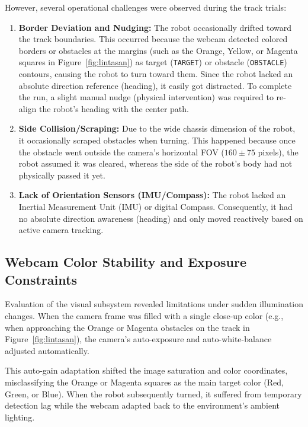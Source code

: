 However, several operational challenges were observed during the track trials:
\begin{enumerate}
    \item \textbf{Border Deviation and Nudging:} The robot occasionally drifted toward the track boundaries. This occurred because the webcam detected colored borders or obstacles at the margins (such as the Orange, Yellow, or Magenta squares in Figure~\ref{fig:lintasan}) as target (\texttt{TARGET}) or obstacle (\texttt{OBSTACLE}) contours, causing the robot to turn toward them. Since the robot lacked an absolute direction reference (heading), it easily got distracted. To complete the run, a slight manual nudge (physical intervention) was required to re-align the robot's heading with the center path.
    \item \textbf{Side Collision/Scraping:} Due to the wide chassis dimension of the robot, it occasionally scraped obstacles when turning. This happened because once the obstacle went outside the camera's horizontal FOV ($160 \pm 75$ pixels), the robot assumed it was cleared, whereas the side of the robot's body had not physically passed it yet.
    \item \textbf{Lack of Orientation Sensors (IMU/Compass):} The robot lacked an Inertial Measurement Unit (IMU) or digital Compass. Consequently, it had no absolute direction awareness (heading) and only moved reactively based on active camera tracking.
\end{enumerate}

\subsection{Webcam Color Stability and Exposure Constraints}
Evaluation of the visual subsystem revealed limitations under sudden illumination changes. When the camera frame was filled with a single close-up color (e.g., when approaching the Orange or Magenta obstacles on the track in Figure~\ref{fig:lintasan}), the camera's auto-exposure and auto-white-balance adjusted automatically.

This auto-gain adaptation shifted the image saturation and color coordinates, misclassifying the Orange or Magenta squares as the main target color (Red, Green, or Blue). When the robot subsequently turned, it suffered from temporary detection lag while the webcam adapted back to the environment's ambient lighting.
